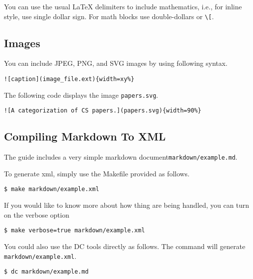 You can use the usual LaTeX delimiters to include mathematics, i.e., for inline style, use single dollar sign.
%
For math blocks use double-dollars or \lstinline`\[`.

\subsection{Images}

\begin{flex}
\begin{gram}
You can include JPEG, PNG, and SVG images by using following syntax.
\begin{lstlisting}
![caption](image_file.ext){width=xy%}
\end{lstlisting}
\end{gram}

\begin{example}
The following code displays the image \lstinline`papers.svg`.
\begin{lstlisting}
![A categorization of CS papers.](papers.svg){width=90%}
\end{lstlisting}
\end{example}
\end{flex}

\subsection{Compiling Markdown To XML}

The guide includes a very simple markdown document\lstinline`markdown/example.md`.

\begin{gram}
To generate xml, simply use the Makefile provided as follows.
%
\begin{lstlisting}
$ make markdown/example.xml
\end{lstlisting}
%
If you would like to know more about how thing are being handled, you can turn on the verbose option
%
\begin{lstlisting}
$ make verbose=true markdown/example.xml 
\end{lstlisting}
\end{gram}

\begin{gram}
You could also use the DC tools directly as follows.
%
The command will generate  \lstinline`markdown/example.xml`.

\begin{lstlisting}
$ dc markdown/example.md
\end{lstlisting}

\end{gram}

